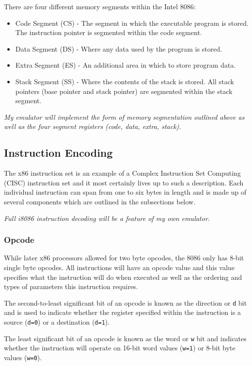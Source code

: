     There are four different memory segments within the Intel 8086:
    \begin{itemize}
        \item Code Segment (CS) - The segment in which the executable program is stored. The instruction pointer is segmented within the code segment.
        \item Data Segment (DS) - Where any data used by the program is stored.
        \item Extra Segment (ES) - An additional area in which to store program data.
        \item Stack Segment (SS) - Where the contents of the stack is stored. All stack pointers (base pointer and stack pointer) are segmented within the stack segment.
    \end{itemize}

    \textit{My emulator will implement the form of memory segmentation outlined above as well as the four segment registers (code, data, extra, stack).}

\subsection{Instruction Encoding}
    The x86 instruction set is an example of a Complex Instruction Set Computing (CISC) instruction set and it most certainly lives up to such a description. Each individual instruction can span from one to six bytes in length and is made up of several components which are outlined in the subsections below.

    \textit{Full i8086 instruction decoding will be a feature of my own emulator.}

    \subsubsection{Opcode}
        While later x86 processors allowed for two byte opcodes, the 8086 only has 8-bit single byte opcodes. All instructions will have an opcode value and this value specifies what the instruction will do when executed as well as the ordering and types of parameters this instruction requires.

        The second-to-least significant bit of an opcode is known as the direction or \texttt{d} bit and is used to indicate whether the register specified within the instruction is a source (\texttt{d=0}) or a destination (\texttt{d=1}).

        The least significant bit of an opcode is known as the word or \texttt{w} bit and indicates whether the instruction will operate on 16-bit word values (\texttt{w=1}) or 8-bit byte values (\texttt{w=0}).

